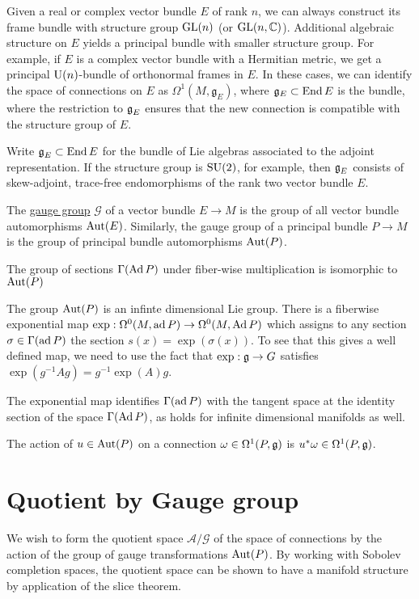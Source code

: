 Given a real or complex vector bundle $E$ of rank $n$, we can always construct 
its frame bundle with structure group $\operatorname{GL}(n)$ (or $\operatorname{GL}(n,\mathbb{C})$).
Additional algebraic structure on $E$ yields a principal bundle with smaller
structure group. For example,
if $E$ is a complex vector bundle with a Hermitian metric, we get a principal
$\operatorname{U}(n)$-bundle of orthonormal frames in  $E$. In these cases, we can identify
the space of connections on $E$ as $\Omega^1(M,\mathfrak{g}_E)$, where
$\mathfrak{g}_E \subset \operatorname{End} E$ is the bundle, 
where the restriction to $\operatorname{\mathfrak{g}}_E$ ensures that the new connection is
compatible with the structure group of  $E$.


Write $\operatorname{\mathfrak{g}}_E \subset \operatorname{End} E$ for the bundle of Lie algebras associated to the
adjoint representation. 
If the structure group is $\operatorname{SU}(2)$, for example, then
$\operatorname{\mathfrak{g}}_E$ consists of skew-adjoint, trace-free endomorphisms of the rank two vector
bundle $E$. 

\begin{defn}
	The \underline{gauge group} $\mathcal{G}$ of a vector bundle $E\to M$ is the group of all
	vector bundle automorphisms $\operatorname{Aut}(E)$. Similarly, the gauge group of a
	principal bundle $P\to M$ is the group of principal bundle automorphisms
	$\operatorname{Aut}(P)$.
\end{defn}

\begin{prop} %
	The group of sections $\Gamma(\operatorname{Ad} P)$ under fiber-wise multiplication is
	isomorphic to $\operatorname{Aut}(P)$
\end{prop}
The group $\operatorname{Aut}(P)$ is an infinte dimensional Lie group. 
There is a fiberwise exponential map $\exp : \Omega^0(M,\operatorname{ad} P) \to
\Omega^0(M,\operatorname{Ad} P)$ which assigns to any section  $\sigma \in \Gamma(\operatorname{ad} P)$ the
section  $s(x)=\exp(\sigma(x))$. To see that this gives a well defined map, we
need to use the fact that  $\exp : \operatorname{\mathfrak{g}} \to G$ satisfies
$\exp(g^{-1}Ag)=g^{-1}\exp(A)g$. 

The exponential map identifies $\Gamma(\operatorname{ad} P)$ with the tangent space at the
identity section of the space  $\Gamma(\operatorname{Ad} P)$, as holds for infinite
dimensional manifolds as well. 

The action of $u \in \operatorname{Aut}(P)$ on a connection  $\omega\in \Omega^1(P,\operatorname{\mathfrak{g}})$ is
$u^*\omega \in \Omega^1(P,\operatorname{\mathfrak{g}})$. 

\section{Quotient by Gauge group}
We wish to form the quotient space $\mathcal{A} /\mathcal{G}$ 
of the space of connections by the action of
the group of gauge transformations $\operatorname{Aut}(P)$. By working with Sobolev completion
spaces, the quotient space can be shown to have a manifold structure by 
application of the slice theorem.

